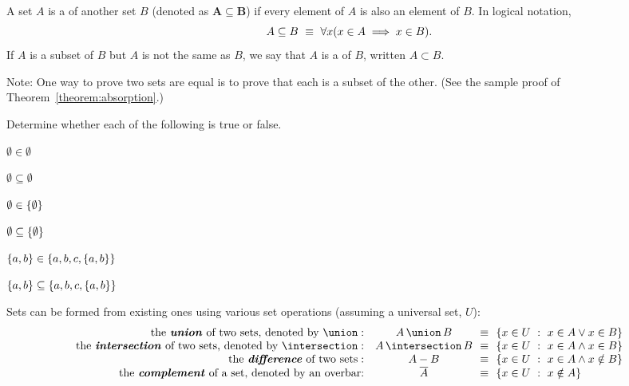 \begin{defn}[Subsets]
A set $A$ is a  of another set $B$ (denoted as $\bm{A \subseteq B}$) if every element of $A$ is also an element of $B$. In logical notation, \[A \subseteq B \ \equiv\  \forall x (x \in A \implies x \in B).\]
If $A$ is a subset of $B$ but $A$ is not the same as $B$, we say that $A$ is a  of $B$, written $A \subset B$.

Note: One way to prove two sets are equal is to prove that each is a subset of the other. (See the sample proof of Theorem~\ref{theorem:absorption}.)
\end{defn}

\begin{exer1}  %
Determine whether each of the following is true or false.
\begin{exenumerate}
\item $\emptyset \in \emptyset$
\item $\emptyset \subseteq \emptyset$ 
\item $\emptyset \in \left\lbrace \emptyset \right\rbrace$
\item $\emptyset \subseteq \left\lbrace \emptyset \right\rbrace$
\item $\left\lbrace a, b \right\rbrace \in \left\lbrace a, b, c, \left\lbrace a, b \right\rbrace \right\rbrace$
\item $\left\lbrace a, b \right\rbrace \subseteq \left\lbrace a, b, c, \left\lbrace a, b \right\rbrace \right\rbrace$
\end{exenumerate}
\end{exer1}

\begin{defn}\label{definition:setops}
Sets can be formed from existing ones using various set operations (assuming a universal set, $U$):
\[
\begin{array}{r@{\ \ \ }c@{\ \definedas\ }l}
\textrm{the \defterm{union} of two sets, denoted by}~\union: & \setunion{A}{B} & \setbuild{x \in U}{x \in A \lor x \in B} \\
\textrm{the \defterm{intersection} of two sets, denoted by}~\intersection: & \setintersection{A}{B} &
					 \setbuild{x \in U}{x \in A \land x \in B} \\
\textrm{the \defterm{difference} of two sets}: & A - B & \setbuild{x \in U}{x \in A \land x \notin B} \\
\textrm{the \defterm{complement} of a set, denoted by an overbar:} & \setcomplement{A} &
					 \setbuild{x \in U}{x \notin A}
\end{array}
\]

\end{defn}


